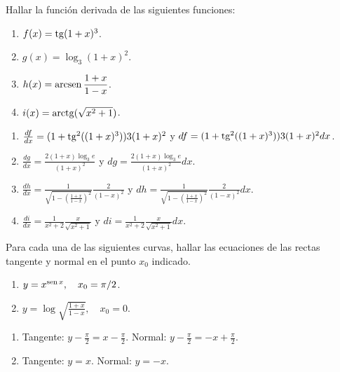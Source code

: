 {Hallar la función derivada de las siguientes funciones:
\begin{multicols}{2}
\begin{enumerate}
\item $f(x)=\operatorname{tg}(1+x)^3$.
\item $g(x)=\log_{3}(1+x)^2$.
\item $h(x)=\operatorname{arcsen}\dfrac{1+x}{1-x}$.
\item $i(x)= \operatorname{arctg}(\sqrt{x^2+1})$.
\end{enumerate}
\end{multicols}
}
{\begin{enumerate}
\item $\frac{df}{dx} = (1 + \operatorname{tg}^2((1+x)^3))3(1+x)^2$ y $df = (1 + \operatorname{tg}^2((1+x)^3))3(1+x)^2 dx$.
\item $\frac{dg}{dx} = \frac{2(1+x)\log_3e}{(1+x)^2}$ y $dg = \frac{2(1+x)\log_3e}{(1+x)^2} dx$.
\item $\frac{dh}{dx} = \frac{1}{\sqrt{1-\left(\frac{1+x}{1-x}\right)^2}}\frac{2}{(1-x)^2}$ y $dh = \frac{1}{\sqrt{1-\left(\frac{1+x}{1-x}\right)^2}}\frac{2}{(1-x)^2} dx$.
\item $\frac{di}{dx} = \frac{1}{x^2+2}\frac{x}{\sqrt{x^2+1}}$ y $di = \frac{1}{x^2+2}\frac{x}{\sqrt{x^2+1}} dx$.
\end{enumerate}
}
{
}


{Para cada una de las siguientes curvas, hallar las ecuaciones de las rectas tangente y normal en el punto $x_{0}$ indicado.
\begin{multicols}{2}
\begin{enumerate}
\item  $y=x^{\operatorname{sen} x},\quad x_{0}=\pi/2$.
\item  $y=\log \sqrt{\frac{1+x}{1-x}}, \quad x_{0}=0$.
\end{enumerate}
\end{multicols}
}
{\begin{enumerate}
\item Tangente: $y-\frac{\pi}{2} = x-\frac{\pi}{2}$. Normal: $y-\frac{\pi}{2} = -x+\frac{\pi}{2}$.
\item Tangente: $y = x$. Normal: $y = -x$.
\end{enumerate}
}
{
}


